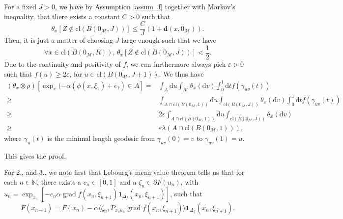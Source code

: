 \documentclass{article}
\newcommand{\CM}{\mathcal{M}}
\newcommand{\BN}{\mathbb{N}}
\newcommand{\rd}{\mathrm{d}}
\newcommand{\bd}{\mathbf{d}}
\DeclareMathOperator{\grad}{grad}
\begin{document}
For a fixed $J>0$, we have by Assumption \ref{assum_f} together with Markov's inequality, that there exists a constant $C>0$ such that
\begin{equation}
    \theta_x[Z\notin \text{cl}(B(0_\CM,J))]\leq \frac{C}{J}(1+\bd(x,0_\CM)).
\end{equation}
Then, it is just a matter of choosing $J$ large enough such that we have
\begin{equation}
    \forall x\in\text{cl}(B(0_\CM,R)),\, \theta_x[Z\notin \text{cl}(B(0_{\CM},J))]<\frac{1}{2}.
\end{equation}
Due to the continuity and positivity of $f$, we can furthermore always pick $\varepsilon>0$ such that $f(u)\geq 2\varepsilon$, for $u\in\text{cl}(B(0_\CM,J+1))$. We thus have
\begin{equation}
    \begin{aligned}
        (\theta_x\otimes\rho)[\exp_x(-\alpha(\phi(x,\xi_1)+\epsilon_{1})\in A]=&\int_A \rd u\int_{\CM}\theta_x(\rd v)\int_0^1\rd tf(\gamma_{uv}(t))\\
        \geq&\int_{A\cap \text{cl}(B(0_\CM,1))}\rd u\int_{\text{cl}(B(0_\CM,J))}\theta_x(\rd v)\int_0^1\rd tf(\gamma_{uv}(t))\\
        \geq& 2\varepsilon\int_{A\cap \text{cl}(B(0_\CM,1))}\rd u\int_{\text{cl}(B(0_\CM,J))}\theta_x(\rd v)\\
        \geq&\varepsilon\lambda(A\cap \text{cl}(B(0_\CM,1))),
    \end{aligned}
\end{equation}
where $\gamma_u(t)$ is the minimal length geodesic from $\gamma_{uv}(0)=v$ to $\gamma_{uv}(1)=u$.

This gives the proof.


For 2., and 3., we note first that Lebourg's mean value theorem tells us that for each $n\in\BN$, there exists a $c_n\in [0,1]$ and a $\zeta_n\in\partial F(u_n)$, with $u_n=\exp_{x_n}[-c_n\alpha \grad f(x_n,\xi_{n+1})\mathbf{1}_{\Delta_f}(x_n,\xi_{n+1})]$, such that
\begin{equation}
    F(x_{n+1})=F(x_n)-\alpha\langle \zeta_n,P_{x_nu_n}\grad f(x_n,\xi_{n+1})\rangle\mathbf{1}_{\Delta_f}(x_n,\xi_{n+1}).
\end{equation}
\end{document}
